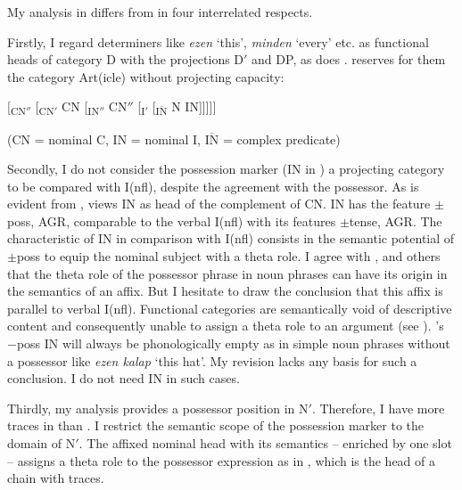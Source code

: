 \documentclass[output=paper,colorlinks,citecolor=brown]{langscibook}
\begin{document}
My analysis in  differs from \citet{Szabolosi87Functional-categories} in four interrelated respects.

Firstly, I regard determiners like \textit{ezen} `this', \textit{minden} `every' etc. as functional heads of category D with the projections D$'$ and DP, as does \citet{Abney86Functional-elements, Abney87The-English}. \citet{Szabolosi87Functional-categories} reserves for them the category Art(icle) without projecting capacity:

\ea \label{ex:zi91:19} $[$\textsubscript{CN$''$} [\textsubscript{CN$'$} CN [\textsubscript{IN$''$} CN$''$ [\textsubscript{I$'$}  [\textsubscript{$\overline{\text{IN}}$} N IN]]]]] \vspace{5pt}

(CN = nominal C, IN = nominal I, $\overline{\text{IN}}$ = complex predicate)
\z

\largerpage
\noindent Secondly, I do not consider the possession marker (IN in ) a projecting category to be compared with I(nfl), despite the agreement with the possessor. As is evident from , \citet[171]{Szabolosi87Functional-categories} views IN as head of the complement of CN. IN has the feature $\pm$poss, AGR, comparable to the verbal I(nfl) with its features $\pm$tense, AGR. The characteristic of IN in comparison with I(nfl) consists in the semantic potential of $\pm$poss to equip the nominal subject with a theta role. I agree with \citet{Szabolosi87Functional-categories}, \citet{Anderson83Prenominal-genitive} and others that the theta role of the possessor phrase in noun phrases can have its origin in the semantics of an affix. But I hesitate to draw the conclusion that this affix is parallel to verbal I(nfl). Functional categories are semantically void of descriptive content and consequently unable to assign a theta role to an argument (see \citealt{Abney86Functional-elements, Abney87The-English}). \citeauthor{Szabolosi87Functional-categories}'s $-$poss IN will always be phonologically empty as in simple noun phrases without a possessor like \textit{ezen kalap} `this hat'. My revision lacks any basis for such a conclusion. I do not need IN in such cases.

Thirdly, my analysis provides a possessor position in N$'$. Therefore, I have more traces in  than \citet{Szabolosi87Functional-categories}. I restrict the semantic scope of the possession marker to the domain of N$'$. The affixed nominal head with its semantics -- enriched by one slot -- assigns a theta role to the possessor expression as in , which is the head of a chain with traces.
\end{document}

